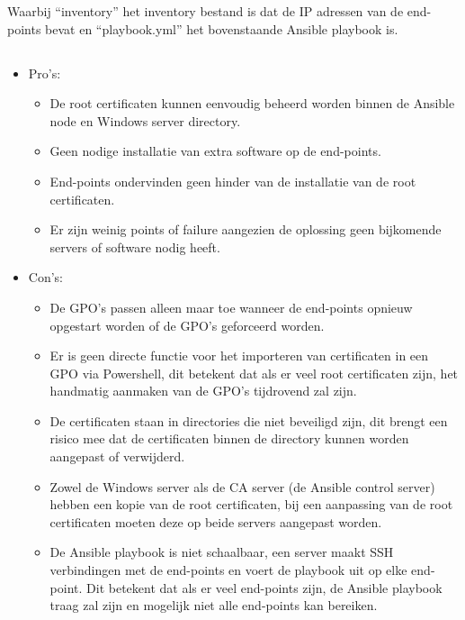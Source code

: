 Waarbij ``inventory'' het inventory bestand is dat de IP adressen van de end-points bevat en ``playbook.yml'' het bovenstaande Ansible playbook is.

\pagebreak

\subsection{}
\label{subsec:Pros_en_Cons_van_de_eerste_oplossing}
\begin{itemize}
    \item Pro's:
    \begin{itemize}
        \item De root certificaten kunnen eenvoudig beheerd worden binnen de Ansible node en Windows server directory.
        \item Geen nodige installatie van extra software op de end-points.
        \item End-points ondervinden geen hinder van de installatie van de root certificaten.
        \item Er zijn weinig points of failure aangezien de oplossing geen bijkomende servers of software nodig heeft.
    \end{itemize}
    \item Con's:
    \begin{itemize}
        \item De GPO's passen alleen maar toe wanneer de end-points opnieuw opgestart worden of de GPO's geforceerd worden.
        \item Er is geen directe functie voor het importeren van certificaten in een GPO via Powershell, dit betekent dat als er veel root certificaten zijn, het handmatig aanmaken van de GPO's tijdrovend zal zijn.
        \item De certificaten staan in directories die niet beveiligd zijn, dit brengt een risico mee dat de certificaten binnen de directory kunnen worden aangepast of verwijderd.
        \item Zowel de Windows server als de CA server (de Ansible control server) hebben een kopie van de root certificaten, bij een aanpassing van de root certificaten moeten deze op beide servers aangepast worden.
        \item De Ansible playbook is niet schaalbaar, een server maakt SSH verbindingen met de end-points en voert de playbook uit op elke end-point. Dit betekent dat als er veel end-points zijn, de Ansible playbook traag zal zijn en mogelijk niet alle end-points kan bereiken.
    \end{itemize}
\end{itemize}

